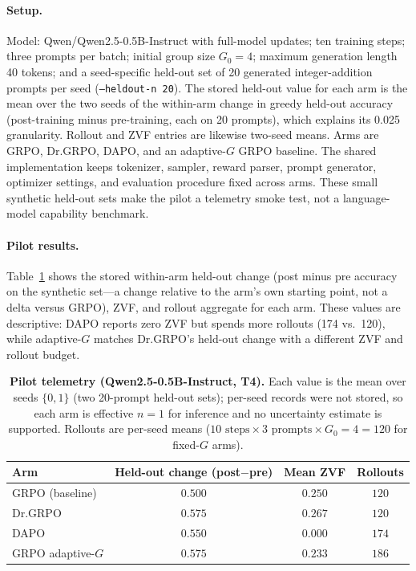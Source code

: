 \documentclass[11pt]{article}
\newcommand{\zvf}{\textnormal{ZVF}}
\newcommand{\grpo}{\textsc{GRPO}}
\begin{document}
\paragraph{Setup.} Model: Qwen/Qwen2.5-0.5B-Instruct with full-model updates;
ten training steps; three prompts per batch; initial group size
$G_0=4$; maximum generation length 40 tokens; and a seed-specific held-out set
of 20 generated integer-addition prompts per seed (\texttt{--heldout-n 20}).
The stored held-out value for each arm is the mean over the two seeds of the
within-arm change in greedy held-out accuracy (post-training minus
pre-training, each on 20 prompts), which explains its 0.025 granularity.
Rollout and \zvf{} entries are likewise two-seed means. Arms are GRPO,
Dr.\grpo{}, DAPO, and
an adaptive-$G$ GRPO baseline. The shared implementation keeps tokenizer,
sampler, reward parser, prompt generator, optimizer settings, and evaluation
procedure fixed across arms. These small synthetic held-out sets make the
pilot a telemetry smoke test, not a language-model capability benchmark.

\paragraph{Pilot results.} Table~\ref{tab:pilot} shows the stored within-arm
held-out change (post minus pre accuracy on the synthetic set---a change
relative to the arm's own starting point, not a delta versus GRPO), \zvf{},
and rollout aggregate for each arm. These values are descriptive: DAPO reports
zero \zvf{} but spends more rollouts (174 vs.\ 120), while adaptive-$G$ matches
Dr.\grpo{}'s held-out change with a different \zvf{} and rollout budget.

\begin{table}[t]
\centering
\caption{\textbf{Pilot telemetry (Qwen2.5-0.5B-Instruct, T4).} Each value is
  the mean over seeds $\{0,1\}$ (two 20-prompt held-out sets); per-seed records
  were not stored, so each arm is effective $n=1$ for inference and no
  uncertainty estimate is supported. Rollouts are per-seed means
  ($10\text{ steps}\times3\text{ prompts}\times G_0{=}4=120$ for fixed-$G$ arms).}
\label{tab:pilot}
\small
\begin{tabular}{@{}lccc@{}}
\toprule
\textbf{Arm} & \textbf{Held-out change (post$-$pre)} & \textbf{Mean \zvf{}} & \textbf{Rollouts}\\
\midrule
GRPO (baseline)          & $0.500$ & $0.250$ & $120$ \\
Dr.\grpo{}                & $0.575$ & $0.267$ & $120$ \\
DAPO                     & $0.550$ & $0.000$ & $174$ \\
GRPO adaptive-$G$        & $0.575$ & $0.233$ & $186$ \\
\bottomrule
\end{tabular}
\end{table}
\end{document}
